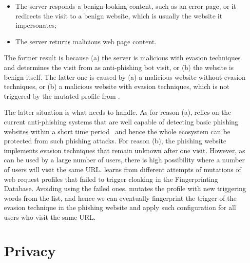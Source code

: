 \begin{itemize}
    \item The server responds a benign-looking content, such as an error page, 
    or it redirects the visit to a benign website, which is usually the website it impersonates;
    \item The server returns malicious web page content.
\end{itemize}


The former result is because (a) the server is malicious with evasion techniques and determines the visit from \spartacus as anti-phishing bot visit, or (b) the website is benign itself.
The latter one is caused by (a) a malicious website without evasion techniques, or (b) a malicious website with evasion techniques, which is not triggered by the mutated profile from \spartacus.

The latter situation is what \spartacus needs to handle.
As for reason (a), \spartacus relies on the current anti-phishing systems that are well capable of detecting basic phishing websites within a short time period~\cite{oest2020phishtime} and hence the whole ecosystem can be protected from such phishing attacks.
For reason (b), the phishing website implements evasion techniques that remain unknown after one visit.
However, as \spartacus can be used by a large number of users, there is high possibility where a number of users will visit the same URL.
\spartacus learns from different attempts of mutations of web request profiles that failed to trigger cloaking in the Fingerprinting Database.
Avoiding using the failed ones, \spartacus mutates the profile with new triggering words from the list, and hence we can eventually fingerprint the trigger of the evasion technique in the phishing website and apply such configuration for all \spartacus users who visit the same URL.






\section{Privacy}

